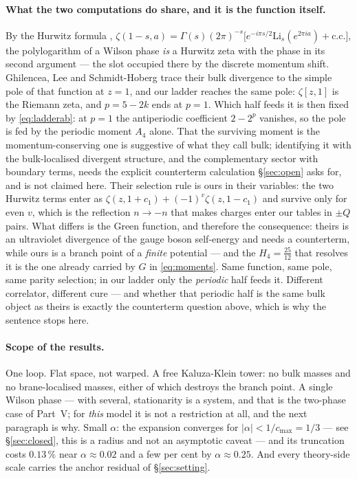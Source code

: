 \documentclass[11pt,a4paper]{article}
\begin{document}
\paragraph{What the two computations do share, and it is the function itself.} By the Hurwitz formula \cite{Hurwitz1882,Apostol},
$\zeta(1-s,a)=\Gamma(s)(2\pi)^{-s}\bigl[e^{-i\pi s/2}\mathrm{Li}_s(e^{2\pi i a})+\text{c.c.}\bigr]$,
the polylogarithm of a Wilson phase \emph{is} a Hurwitz zeta with the phase in its second argument
--- the slot occupied there by the discrete momentum shift. Ghilencea, Lee and Schmidt-Hoberg
\cite{GLS06} trace their bulk divergence to the simple pole of that function at $z=1$, and our
ladder reaches the same pole: $\zeta[z,1]$ is
the Riemann zeta, and $p=5-2k$ ends at $p=1$. Which half feeds it is then fixed by
\eqref{eq:ladderab}: at $p=1$ the antiperiodic coefficient $2-2^{p}$ vanishes, so the pole is fed by
the periodic moment $A_4$ alone. That the surviving moment is the momentum-conserving one is
suggestive of what they call bulk; identifying it with the bulk-localised divergent structure, and
the complementary sector with boundary terms, needs the explicit counterterm calculation
\S\ref{sec:open} asks for, and is not claimed here. Their selection rule is ours in their variables: the two Hurwitz terms enter as
$\zeta(z,1+c_1)+(-1)^{v}\zeta(z,1-c_1)$ and survive only for even $v$, which is the reflection
$n\to-n$ that makes charges enter our tables in $\pm Q$ pairs. What differs is the Green function,
and therefore the consequence: theirs is an ultraviolet divergence of the gauge boson self-energy
and needs a counterterm, while ours is a branch point of a \emph{finite} potential --- and the
$H_4=\tfrac{25}{12}$ that resolves it is the one already carried by $G$ in \eqref{eq:moments}. Same
function, same pole, same parity selection; in our ladder only the \emph{periodic} half feeds it.
Different correlator, different cure --- and whether that periodic half is the same bulk object as
theirs is exactly the counterterm question above, which is why the sentence stops here.

\paragraph{Scope of the results.} One loop. Flat space, not warped. A free Kaluza-Klein tower: no
bulk masses and no brane-localised masses, either of which destroys the branch point. A single
Wilson phase --- with several, stationarity is a system, and that is the two-phase case of Part~V;
for \emph{this} model it is not a restriction at all, and the next paragraph is why.
Small $\alpha$: the expansion converges for $|\alpha|<1/c_{\max}=1/3$ --- see
\S\ref{sec:closed}, this is a radius and not an asymptotic caveat --- and its truncation costs
$0.13\,\%$ near $\alpha\approx0.02$ and a few per cent by $\alpha\approx0.25$. And every
theory-side scale carries the anchor residual of \S\ref{sec:setting}.
\end{document}
